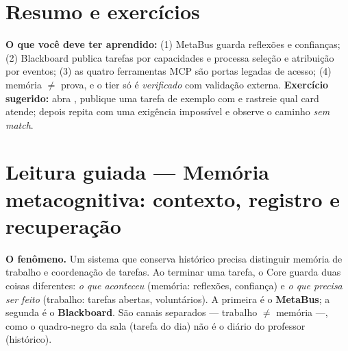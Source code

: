 \section{Resumo e exercícios}

\begin{resultado}
\textbf{O que você deve ter aprendido:} (1) MetaBus guarda reflexões e
confianças; (2) Blackboard publica tarefas por capacidades e processa
seleção e atribuição por eventos; (3) as quatro ferramentas MCP são portas legadas de acesso;
(4) memória $\neq$ prova, e o tier só é \emph{verificado} com validação externa.
\textbf{Exercício sugerido:} abra , publique uma tarefa
de exemplo com  e rastreie qual card atende;
depois repita com uma exigência impossível e observe o caminho \emph{sem match}.
\end{resultado}



\section[Leitura guiada]{Leitura guiada — Memória metacognitiva: contexto, registro e recuperação}


\begin{descricao}
\textbf{O fenômeno.} Um sistema que conserva histórico precisa distinguir memória de trabalho
e coordenação de tarefas. Ao terminar uma tarefa, o Core guarda duas coisas
diferentes: \emph{o que aconteceu} (memória: reflexões, confiança) e \emph{o que
precisa ser feito} (trabalho: tarefas abertas, voluntários). A primeira é o
\textbf{MetaBus}; a segunda é o \textbf{Blackboard}. São canais separados ---
trabalho $\neq$ memória ---, como o quadro-negro da sala (tarefa do dia) não é o
diário do professor (histórico).
\end{descricao}

